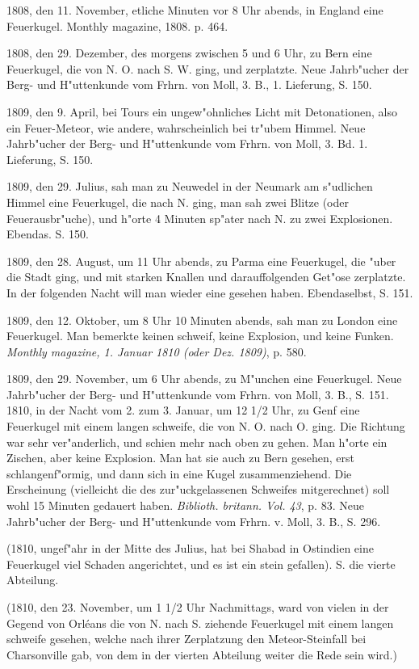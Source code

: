 \documentclass[a4paper, 11pt, oneside, polutonikogreek, german]{article}
\begin{document}
1808, den 11. November, etliche Minuten vor 8 Uhr abends, in England eine Feuerkugel. Monthly magazine, 1808. p. 464.

1808, den 29. Dezember, des morgens zwischen 5 und 6 Uhr, zu Bern eine Feuerkugel, die von N. O. nach S. W. ging, und zerplatzte. Neue Jahrb"ucher der Berg- und H"uttenkunde vom Frhrn. von Moll, 3. B., 1. Lieferung, S. 150.

1809, den 9. April, bei Tours ein ungew"ohnliches Licht mit Detonationen, also ein Feuer-Meteor, wie andere, wahrscheinlich bei tr"ubem Himmel. Neue Jahrb"ucher der Berg- und H"uttenkunde vom Frhrn. von Moll, 3. Bd. 1. Lieferung, S. 150.

1809, den 29. Julius, sah man zu Neuwedel in der Neumark am s"udlichen Himmel eine Feuerkugel, die nach N. ging, man sah zwei Blitze (oder Feuerausbr"uche), und h"orte 4 Minuten sp"ater nach N. zu zwei Explosionen. Ebendas. S. 150.

1809, den 28. August, um 11 Uhr abends, zu Parma eine Feuerkugel, die "uber die Stadt ging, und mit starken Knallen und darauffolgenden Get"ose zerplatzte. In der folgenden Nacht will man wieder eine gesehen haben. Ebendaselbst, S. 151.

1809, den 12. Oktober, um 8 Uhr 10 Minuten abends, sah man zu London eine Feuerkugel. Man bemerkte keinen schweif, keine Explosion, und keine Funken. \emph{Monthly magazine, 1. Januar 1810 (oder Dez. 1809)}, p. 580.

1809, den 29. November, um 6 Uhr abends, zu M"unchen eine Feuerkugel. Neue Jahrb"ucher der Berg- und H"uttenkunde vom Frhrn. von Moll, 3. B., S. 151. 1810, in der Nacht vom 2. zum 3. Januar, um 12 1/2 Uhr, zu Genf eine Feuerkugel mit einem langen schweife, die von N. O. nach O. ging. Die Richtung war sehr ver"anderlich, und schien mehr nach oben zu gehen. Man h"orte ein Zischen, aber keine Explosion. Man hat sie auch zu Bern gesehen, erst schlangenf"ormig, und dann sich in eine Kugel zusammenziehend. Die Erscheinung (vielleicht die des zur"uckgelassenen Schweifes mitgerechnet) soll wohl 15 Minuten gedauert haben. \emph{Biblioth. britann. Vol. 43}, p. 83. Neue Jahrb"ucher der Berg- und H"uttenkunde vom Frhrn. v. Moll, 3. B., S. 296.

(1810, ungef"ahr in der Mitte des Julius, hat bei Shabad in Ostindien eine Feuerkugel viel Schaden angerichtet, und es ist ein stein gefallen). S. die vierte Abteilung.

(1810, den 23. November, um 1 1/2 Uhr Nachmittags, ward von vielen in der Gegend von Orléans die von N. nach S. ziehende Feuerkugel mit einem langen schweife gesehen, welche nach ihrer Zerplatzung den Meteor-Steinfall bei Charsonville gab, von dem in der vierten Abteilung weiter die Rede sein wird.)
\end{document}

